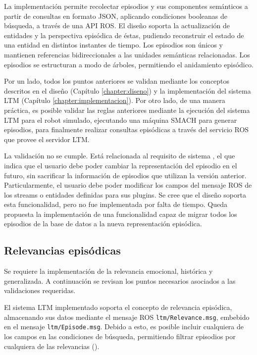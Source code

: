 La implementación permite recolectar episodios y sus componentes semánticos a partir de consultas en formato JSON, aplicando condiciones booleanas de búsqueda, a través de una API ROS. El diseño soporta la actualización de entidades y la perspectiva episódica de éstas, pudiendo reconstruir el estado de una entidad en distintos instantes de tiempo. Los episodios son únicos y mantienen referencias bidireccionales a las unidades semánticas relacionadas. Los episodios se estructuran a modo de árboles, permitiendo el anidamiento episódico.

Por un lado, todos los puntos anteriores se validan mediante los conceptos descritos en el diseño (Capítulo \ref{chapter:diseno}) y la implementación del sistema LTM (Capítulo \ref{chapter:implementacion}). Por otro lado, de una manera práctica, es posible validar las reglas anteriores mediante la ejecución del sistema LTM para el robot simulado, ejecutando una máquina SMACH para generar episodios, para finalmente realizar consultas episódicas a través del servicio ROS que provee el servidor LTM.

La validación  no se cumple. Está relacionada al requisito de sistema , el que indica que el usuario debe poder cambiar la representación del episodio en el futuro, sin sacrificar la información de episodios que utilizan la versión anterior. Particularmente, el usuario debe poder modificar los campos del mensaje ROS de los streams o entidades definidas para sus plugins. Se cree que el diseño soporta esta funcionalidad, pero no fue implementada por falta de tiempo. Queda propuesta la implementación de una funcionalidad capaz de migrar todos los episodios de la base de datos a la nueva representación episódica.

\subsection{Relevancias episódicas}

Se requiere la implementación de la relevancia emocional, histórica y generalizada. A continuación se revisan los puntos necesarios asociados a las validaciones requeridas.

El sistema LTM implementado soporta el concepto de relevancia episódica, almacenando sus datos mediante el mensaje ROS \texttt{ltm/Relevance.msg}, embebido en el mensaje \texttt{ltm/Episode.msg}. Debido a esto, es posible incluir cualquiera de los campos en las condiciones de búsqueda, permitiendo filtrar episodios por cualquiera de las relevancias ().

